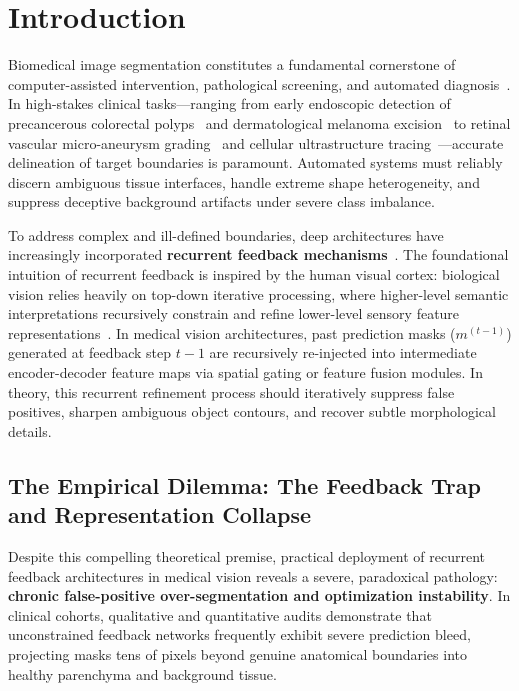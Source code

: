 \section{Introduction}
\label{sec:intro}

Biomedical image segmentation constitutes a fundamental cornerstone of computer-assisted intervention, pathological screening, and automated diagnosis~\cite{litjens2017survey, ronneberger2015unet}. In high-stakes clinical tasks---ranging from early endoscopic detection of precancerous colorectal polyps~\cite{siegel2023colorectal, jha2020kvasir, bernal2017comparative} and dermatological melanoma excision~\cite{codella2019skin} to retinal vascular micro-aneurysm grading~\cite{hoover2000locating, staal2004ridge} and cellular ultrastructure tracing~\cite{cardona2010integrated, caicedo2019nucleus}---accurate delineation of target boundaries is paramount. Automated systems must reliably discern ambiguous tissue interfaces, handle extreme shape heterogeneity, and suppress deceptive background artifacts under severe class imbalance.

To address complex and ill-defined boundaries, deep architectures have increasingly incorporated \textbf{recurrent feedback mechanisms}~\cite{liang2015recurrent, alom2018recurrent, pinheiro2014recurrent, zamir2017feedback}. The foundational intuition of recurrent feedback is inspired by the human visual cortex: biological vision relies heavily on top-down iterative processing, where higher-level semantic interpretations recursively constrain and refine lower-level sensory feature representations~\cite{gilbert2013top, kietzmann2019recurrence}. In medical vision architectures, past prediction masks ($m^{(t-1)}$) generated at feedback step $t-1$ are recursively re-injected into intermediate encoder-decoder feature maps via spatial gating or feature fusion modules. In theory, this recurrent refinement process should iteratively suppress false positives, sharpen ambiguous object contours, and recover subtle morphological details.

\subsection{The Empirical Dilemma: The Feedback Trap and Representation Collapse}
Despite this compelling theoretical premise, practical deployment of recurrent feedback architectures in medical vision reveals a severe, paradoxical pathology: \textbf{chronic false-positive over-segmentation and optimization instability}. In clinical cohorts, qualitative and quantitative audits demonstrate that unconstrained feedback networks frequently exhibit severe prediction bleed, projecting masks tens of pixels beyond genuine anatomical boundaries into healthy parenchyma and background tissue. 

